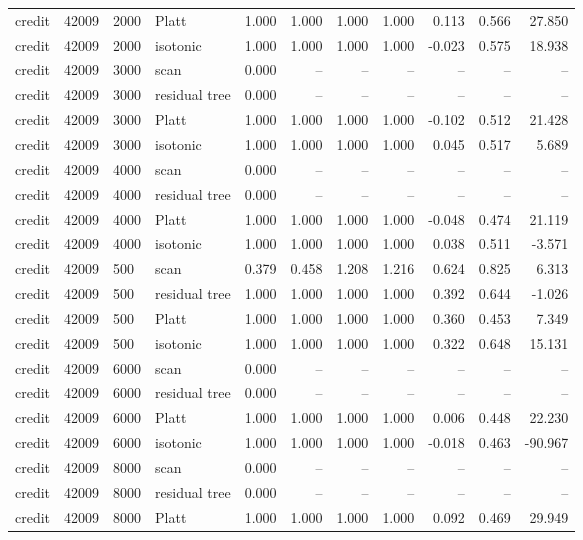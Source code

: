 \begin{tabular}{lrllrrrrrrr}
credit & 42009 & 2000 & Platt & 1.000 & 1.000 & 1.000 & 1.000 & 0.113 & 0.566 & 27.850 \\
credit & 42009 & 2000 & isotonic & 1.000 & 1.000 & 1.000 & 1.000 & -0.023 & 0.575 & 18.938 \\
credit & 42009 & 3000 & scan & 0.000 & -- & -- & -- & -- & -- & -- \\
credit & 42009 & 3000 & residual tree & 0.000 & -- & -- & -- & -- & -- & -- \\
credit & 42009 & 3000 & Platt & 1.000 & 1.000 & 1.000 & 1.000 & -0.102 & 0.512 & 21.428 \\
credit & 42009 & 3000 & isotonic & 1.000 & 1.000 & 1.000 & 1.000 & 0.045 & 0.517 & 5.689 \\
credit & 42009 & 4000 & scan & 0.000 & -- & -- & -- & -- & -- & -- \\
credit & 42009 & 4000 & residual tree & 0.000 & -- & -- & -- & -- & -- & -- \\
credit & 42009 & 4000 & Platt & 1.000 & 1.000 & 1.000 & 1.000 & -0.048 & 0.474 & 21.119 \\
credit & 42009 & 4000 & isotonic & 1.000 & 1.000 & 1.000 & 1.000 & 0.038 & 0.511 & -3.571 \\
credit & 42009 & 500 & scan & 0.379 & 0.458 & 1.208 & 1.216 & 0.624 & 0.825 & 6.313 \\
credit & 42009 & 500 & residual tree & 1.000 & 1.000 & 1.000 & 1.000 & 0.392 & 0.644 & -1.026 \\
credit & 42009 & 500 & Platt & 1.000 & 1.000 & 1.000 & 1.000 & 0.360 & 0.453 & 7.349 \\
credit & 42009 & 500 & isotonic & 1.000 & 1.000 & 1.000 & 1.000 & 0.322 & 0.648 & 15.131 \\
credit & 42009 & 6000 & scan & 0.000 & -- & -- & -- & -- & -- & -- \\
credit & 42009 & 6000 & residual tree & 0.000 & -- & -- & -- & -- & -- & -- \\
credit & 42009 & 6000 & Platt & 1.000 & 1.000 & 1.000 & 1.000 & 0.006 & 0.448 & 22.230 \\
credit & 42009 & 6000 & isotonic & 1.000 & 1.000 & 1.000 & 1.000 & -0.018 & 0.463 & -90.967 \\
credit & 42009 & 8000 & scan & 0.000 & -- & -- & -- & -- & -- & -- \\
credit & 42009 & 8000 & residual tree & 0.000 & -- & -- & -- & -- & -- & -- \\
credit & 42009 & 8000 & Platt & 1.000 & 1.000 & 1.000 & 1.000 & 0.092 & 0.469 & 29.949 \\

\end{tabular}
